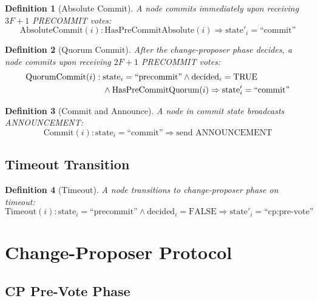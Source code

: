 \documentclass[11pt,a4paper,twoside]{article}
\newtheorem{definition}{Definition}[section]
\begin{document}
\begin{definition}[Absolute Commit]
A node commits immediately upon receiving $3F+1$ PRECOMMIT votes:
\begin{equation}
\text{AbsoluteCommit}(i) : \text{HasPreCommitAbsolute}(i) \Rightarrow \text{state}'_i = \text{``commit''}
\end{equation}
\end{definition}

\begin{definition}[Quorum Commit]
After the change-proposer phase decides, a node commits upon receiving $2F+1$ PRECOMMIT votes:
\begin{align}
\text{QuorumCommit}(i) : {} & \text{state}_i = \text{``precommit''} \land \text{decided}_i = \text{TRUE} \notag \\
& \land \text{HasPreCommitQuorum}(i) \Rightarrow \text{state}'_i = \text{``commit''}
\end{align}
\end{definition}

\begin{definition}[Commit and Announce]
A node in commit state broadcasts ANNOUNCEMENT:
\begin{equation}
\text{Commit}(i) : \text{state}_i = \text{``commit''} \Rightarrow \text{send ANNOUNCEMENT}
\end{equation}
\end{definition}

\subsection{Timeout Transition}
\begin{definition}[Timeout]
A node transitions to change-proposer phase on timeout:
\begin{equation}
\text{Timeout}(i) : \text{state}_i = \text{``precommit''} \land \text{decided}_i = \text{FALSE} \Rightarrow \text{state}'_i = \text{``cp:pre-vote''}
\end{equation}
\end{definition}

\section{Change-Proposer Protocol}

\subsection{CP Pre-Vote Phase}
\end{document}
